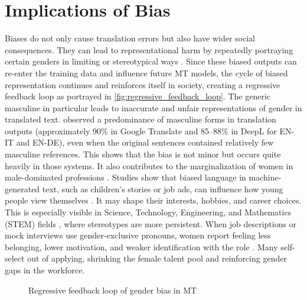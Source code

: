     \section{Implications of Bias}
        Biases do not only cause translation errors but also have wider social consequences. They can lead to representational harm by repeatedly portraying certain genders in limiting or stereotypical ways \parencite{stanczakSurveyGenderBias2021}. Since these biased outputs can re-enter the training data and influence future MT models, the cycle of biased representation continues and reinforces itself in society, creating a regressive feedback loop as portrayed in \autoref{fig:regressive_feedback_loop}. The generic masculine in particular leads to inaccurate and unfair representations of gender in translated text. \textcite{rescignoGenderBiasMachine2023} observed a predominance of masculine forms in translation outputs (approximately 90\% in Google Translate and 85–88\% in DeepL for EN-IT and EN-DE), even when the original sentences contained relatively few masculine references. This shows that the bias is not minor but occurs quite heavily in those systems. It also contributes to the marginalization of women in male-dominated professions \parencite{kapplAreAllSpanish2025}. Studies show that biased language in machine-generated text, such as children's stories or job ads, can influence how young people view themselves \parencite{soundararajanInvestigatingGenderBias2024,kapplAreAllSpanish2025}. It may shape their interests, hobbies, and career choices. This is especially visible in Science, Technology, Engineering, and Mathematics (STEM) fields \parencite{pratesAssessingGenderBias2019}, where stereotypes are more persistent. When job descriptions or mock interviews use gender-exclusive pronouns, women report feeling less belonging, lower motivation, and weaker identification with the role \parencite{godsilEffectsGenderRoles2016}. Many self-select out of applying, shrinking the female talent pool and reinforcing gender gaps in the workforce.


        \vspace{0.8em} 
        \begin{figure}[htb]
            \centering
            \scalebox{0.8}{}
            \caption{Regressive feedback loop of gender bias in MT}
            \label{fig:regressive_feedback_loop}
        \end{figure}
        \vspace{0.8em} 


